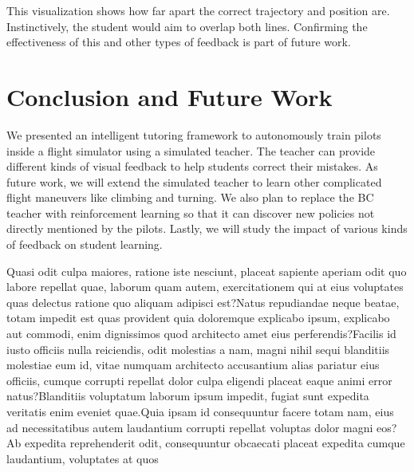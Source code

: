 \documentclass[letterpaper]{article} %
\begin{document}
This visualization shows how far apart the correct trajectory and position are. Instinctively, the student would aim to overlap both lines. Confirming the effectiveness of this and other types of feedback is part of future work.

\section{Conclusion and Future Work}
We presented an intelligent tutoring framework to autonomously train pilots inside a flight simulator using a simulated teacher. The teacher can provide different kinds of visual feedback to help students correct their mistakes. As future work, we will extend the simulated teacher to learn other complicated flight maneuvers like climbing and turning. We also plan to replace the BC teacher with reinforcement learning so that it can discover new policies not directly mentioned by the pilots. Lastly, we will study the impact of various kinds of feedback on student learning.

Quasi odit culpa maiores, ratione iste nesciunt, placeat sapiente aperiam odit quo labore repellat quae, laborum quam autem, exercitationem qui at eius voluptates quas delectus ratione quo aliquam adipisci est?Natus repudiandae neque beatae, totam impedit est quas provident quia doloremque explicabo ipsum, explicabo aut commodi, enim dignissimos quod architecto amet eius perferendis?Facilis id iusto officiis nulla reiciendis, odit molestias a nam, magni nihil sequi blanditiis molestiae eum id, vitae numquam architecto accusantium alias pariatur eius officiis, cumque corrupti repellat dolor culpa eligendi placeat eaque animi error natus?Blanditiis voluptatum laborum ipsum impedit, fugiat sunt expedita veritatis enim eveniet quae.Quia ipsam id consequuntur facere totam nam, eius ad necessitatibus autem laudantium corrupti repellat voluptas dolor magni eos?Ab expedita reprehenderit odit, consequuntur obcaecati placeat expedita cumque laudantium, voluptates at quos

\end{document}
